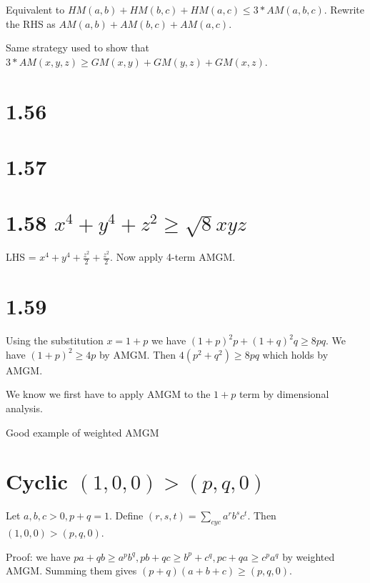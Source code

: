 \documentclass{article}
\begin{document}
Equivalent to $HM(a, b) + HM(b, c) + HM(a, c) \le 3*AM(a, b, c)$. Rewrite the RHS as $AM(a, b) + AM(b, c) + AM(a, c)$.

Same strategy used to show that $3*AM(x, y, z) \ge GM(x, y) + GM(y, z) + GM(x, z)$.

\section*{1.56}

\section*{1.57}

\section*{1.58 $x^4 + y^4 + z^2 \ge \sqrt{8} xyz$}

LHS = $x^4 + y^4 + \frac{z^2}{2} + \frac{z^2}{2}$. Now apply 4-term AMGM.

\section*{1.59}

Using the substitution $x = 1+p$ we have $(1+p)^2p + (1+q)^2q \ge 8pq$. We have $(1 + p)^2 \ge 4p$ by AMGM. Then $4(p^2 + q^2) \ge 8pq$ which holds by AMGM.

We know we first have to apply AMGM to the $1+p$ term by dimensional analysis.

Good example of weighted AMGM

\section*{Cyclic $(1, 0, 0) > (p, q, 0)$}

Let $a, b, c > 0, p+q=1$. Define $(r, s, t) = \sum_{cyc} a^r b^s c^t$. Then $(1, 0, 0) > (p, q, 0)$.

Proof: we have $pa + qb \ge a^p b^q, pb + qc \ge b^p + c^q, pc + qa \ge c^p a^q$ by weighted AMGM. Summing them gives $(p+q)(a + b + c) \ge (p, q, 0)$.
\end{document}
